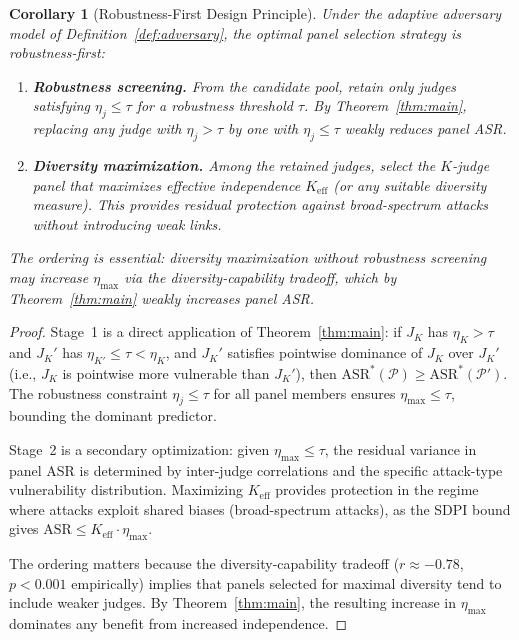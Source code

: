 \documentclass[11pt]{article}
\newtheorem{corollary}[theorem]{Corollary}
\begin{document}
\begin{corollary}[Robustness-First Design Principle]\label{cor:design}
Under the adaptive adversary model of Definition~\ref{def:adversary}, the optimal panel selection strategy is \emph{robustness-first}:
\begin{enumerate}[label=\textbf{Stage~\arabic*}:]
    \item \textbf{Robustness screening.} From the candidate pool, retain only judges satisfying $\eta_j \leq \tau$ for a robustness threshold $\tau$. By Theorem~\ref{thm:main}, replacing any judge with $\eta_j > \tau$ by one with $\eta_j \leq \tau$ weakly reduces panel ASR.
    \item \textbf{Diversity maximization.} Among the retained judges, select the $K$-judge panel that maximizes effective independence $K_{\mathrm{eff}}$ (or any suitable diversity measure). This provides residual protection against broad-spectrum attacks without introducing weak links.
\end{enumerate}
The ordering is essential: diversity maximization without robustness screening may increase $\eta_{\max}$ via the diversity-capability tradeoff, which by Theorem~\ref{thm:main} weakly increases panel ASR.
\end{corollary}

\begin{proof}
Stage~1 is a direct application of Theorem~\ref{thm:main}: if $J_K$ has $\eta_K > \tau$ and $J_K'$ has $\eta_{K'} \leq \tau < \eta_K$, and $J_K'$ satisfies pointwise dominance of $J_K$ over $J_K'$ (i.e., $J_K$ is pointwise more vulnerable than $J_K'$), then $\mathrm{ASR}^*(\mathcal{P}) \geq \mathrm{ASR}^*(\mathcal{P}')$. The robustness constraint $\eta_j \leq \tau$ for all panel members ensures $\eta_{\max} \leq \tau$, bounding the dominant predictor.

Stage~2 is a secondary optimization: given $\eta_{\max} \leq \tau$, the residual variance in panel ASR is determined by inter-judge correlations and the specific attack-type vulnerability distribution. Maximizing $K_{\mathrm{eff}}$ provides protection in the regime where attacks exploit shared biases (broad-spectrum attacks), as the SDPI bound gives $\mathrm{ASR} \leq K_{\mathrm{eff}} \cdot \eta_{\max}$.

The ordering matters because the diversity-capability tradeoff ($r \approx -0.78$, $p < 0.001$ empirically) implies that panels selected for maximal diversity tend to include weaker judges. By Theorem~\ref{thm:main}, the resulting increase in $\eta_{\max}$ dominates any benefit from increased independence.
\end{proof}
\end{document}
